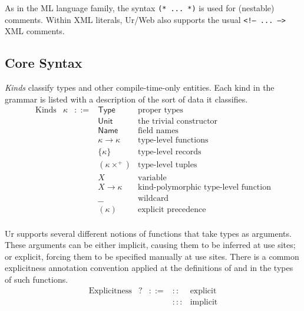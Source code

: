 \documentclass{article}
\newcommand{\mt}[1]{\mathsf{#1}}
\begin{document}
As in the ML language family, the syntax \texttt{(* ... *)} is used for (nestable) comments.  Within XML literals, Ur/Web also supports the usual \texttt{<!-- ... -->} XML comments.

\subsection{\label{core}Core Syntax}

\emph{Kinds} classify types and other compile-time-only entities.  Each kind in the grammar is listed with a description of the sort of data it classifies.
$$\begin{array}{rrcll}
  \textrm{Kinds} & \kappa &::=& \mt{Type} & \textrm{proper types} \\
  &&& \mt{Unit} & \textrm{the trivial constructor} \\
  &&& \mt{Name} & \textrm{field names} \\
  &&& \kappa \to \kappa & \textrm{type-level functions} \\
  &&& \{\kappa\} & \textrm{type-level records} \\
  &&& (\kappa\times^+) & \textrm{type-level tuples} \\
  &&& X & \textrm{variable} \\
  &&& X \longrightarrow \kappa & \textrm{kind-polymorphic type-level function} \\
  &&& \_\_ & \textrm{wildcard} \\
  &&& (\kappa) & \textrm{explicit precedence} \\
\end{array}$$

Ur supports several different notions of functions that take types as arguments.  These arguments can be either implicit, causing them to be inferred at use sites; or explicit, forcing them to be specified manually at use sites.  There is a common explicitness annotation convention applied at the definitions of and in the types of such functions.
$$\begin{array}{rrcll}
  \textrm{Explicitness} & ? &::=& :: & \textrm{explicit} \\
  &&& ::: & \textrm{implicit}
\end{array}$$
\end{document}
